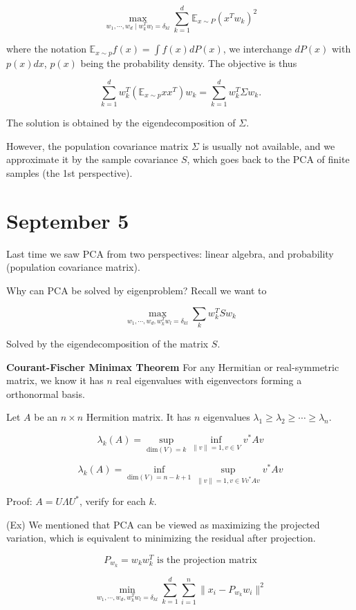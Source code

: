 \documentclass[12pt]{article}
\theoremstyle{plain}
\begin{document}
$$ \max_{w_1, \cdots, w_d \mid w_k^T w_l = \delta_{kl}} \sum_{k=1}^d \mathbb{E}_{x \sim P} (x^T w_k)^2 $$

where the notation $ \mathbb{E}_{x \sim p} f(x) = \int f(x) dP(x) $, we interchange $dP(x)$ with $p(x)dx$, $p(x)$ being the probability density. The objective is thus

$$ \sum_{k=1}^d w_k^T (\mathbb{E}_{x \sim p} x x^T) w_k = \sum_{k=1}^d w_k^T \Sigma w_k.$$

The solution is obtained by the eigendecomposition of $\Sigma$. 

However, the population covariance matrix $\Sigma$ is usually not available, and we approximate it by the sample covariance $S$, which goes back to the PCA of finite samples (the 1st perspective).

\newpage
\part*{September 5}

Last time we saw PCA from two perspectives: linear algebra, and probability (population covariance matrix).

Why can PCA be solved by eigenproblem? Recall we want to

$$ \max_{w_1, \cdots, w_d, w_k^T w_l = \delta_{kl}} \sum_{k} w_k^T S w_k $$

Solved by the eigendecomposition of the matrix $S$.

\textbf{Courant-Fischer Minimax Theorem} For any Hermitian or real-symmetric matrix, we know it has $n$ real eigenvalues with eigenvectors forming a orthonormal basis.

Let $A$ be an $n \times n$ Hermition matrix. It has $n$ eigenvalues $\lambda_1 \geq \lambda_2 \geq \cdots \geq \lambda_n$.

$$ \lambda_k(A) = \sup_{\text{dim}(V) = k} \inf_{\| v \| = 1, v \in V} v^*A v $$

$$ \lambda_k(A) = \inf_{\text{dim}(V) = n - k + 1} \sup_{\| v \| = 1, v \in V v^* A v } v^*Av$$

Proof: $A = U \Lambda U^*$, verify for each $k$.

(Ex) We mentioned that PCA can be viewed as maximizing the projected variation, which is equivalent to minimizing the residual after projection.

$$ P_{w_k} = w_k w_k^T \text{ is the projection matrix} $$

$$ \min_{w_1, \cdots, w_d, w_k^T w_l = \delta_{kl} }  \sum_{k=1}^d \sum_{i=1}^n \| x_i - P_{w_k} w_i \|^2 $$
\end{document}
